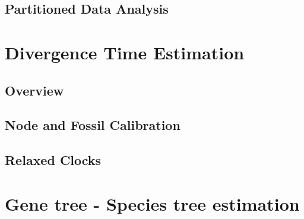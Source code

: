 \documentclass[11pt]{book}
\begin{document}
\chapter{Partitioned Data Analysis}
\def \ResourcePath {RB_Partition_Tutorial/}






\part{Divergence Time Estimation}

%

\chapter{Overview}
\def \ResourcePath {RB_DivergenceTime_Tutorial/}


\chapter{Node and Fossil Calibration}
\def \ResourcePath {RB_DivergenceTime_Calibration_Tutorial/}


\chapter{Relaxed Clocks}
\def \ResourcePath {RB_DivergenceTime_RelaxedClock_Tutorial/}


%




\part{Gene tree - Species tree estimation}
\end{document}
